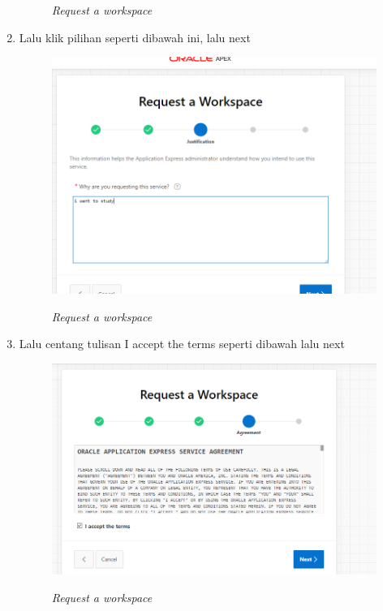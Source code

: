 \begin{enumerate}
\begin{figure}[!htbp]
    \label{gambar 2}
    \caption{\textit{Request a workspace}}
\end{figure} \vspace{6cm}
\item Lalu klik pilihan seperti dibawah ini, lalu next
\begin{figure}[!htbp]
    \centering
    \includegraphics[scale=0.5]{figure/3.PNG}
    \label{gambar 3}
    \caption{\textit{Request a workspace}}
    \vspace{3cm}
\end{figure}
\item Lalu centang tulisan I accept the terms seperti dibawah lalu next
\begin{figure}[!htbp]
    \centering
    \includegraphics[scale=0.5]{figure/5.PNG}
    \label{gambar 4}
    \caption{\textit{Request a workspace}}
\end{figure}

\end{enumerate}
